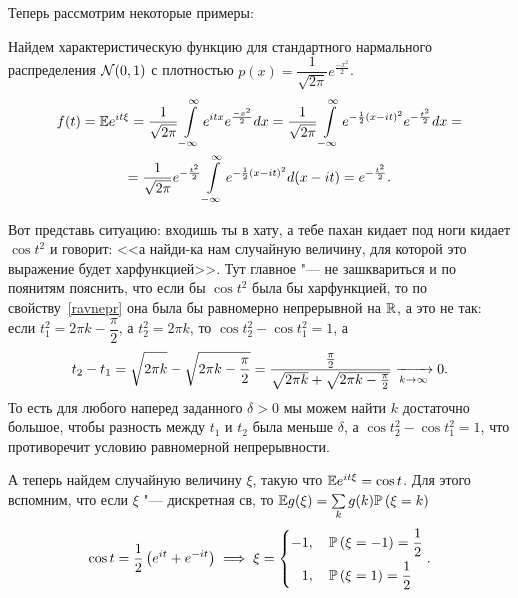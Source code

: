 \documentclass[../TV&MS.tex]{subfiles}
\begin{document}
Теперь рассмотрим некоторые примеры:

\begin{Ex}
    Найдем характеристическую функцию для стандартного нармального распределения $\mathcal{N}(0, 1)$
    с плотностью $p(x) = \dfrac{1}{\sqrt{2\pi}} e^{\frac{-x^2}{2}}$.
    \begin{multline*}
        f(t) = \mathbb{E} e^{it\xi} = 
        \frac{1}{\sqrt{2\pi}}\int\limits_{-\infty}^{\infty} e^{itx} e^{\frac{-x^2}{2}} dx =
        \frac{1}{\sqrt{2\pi}} \int\limits_{-\infty}^{\infty} 
        e^{-\frac{1}{2}(x - it)^2} e^{-\frac{t^2}{2}}dx = \\
        = \frac{1}{\sqrt{2\pi}} e^{-\frac{t^2}{2}} \int\limits_{-\infty}^{\infty}  e^{-\frac{1}{2}(x - it)^2}d(x - it) =
        e^{-\frac{t^2}{2}}
    .\end{multline*}
\end{Ex}

\begin{Ex}
    Вот представь ситуацию: входишь ты в хату, а тебе пахан кидает под ноги
    кидает $\cos t^2$ и говорит: <<а найди-ка нам случайную величину, для 
    которой это выражение будет харфункцией>>. Тут главное "--- не зашквариться
    и по поянитям пояснить, что если бы $\cos t^2$ была бы харфункцией, то по
    свойству~\eqref{ravnepr} она была бы равномерно непрерывной на $\mathbb{R}$,
    а это не так: если $t_1^2 = 2\pi k - \dfrac{\pi}{2}$, а $t_2^2 = 2\pi k$,
    то $\cos t_2^2 - \cos t_1^2 = 1$, а
    \[
        t_2 - t_1 =\sqrt{\vphantom{\frac{\pi}{2}} 2\pi k} - \sqrt{2\pi k - \frac{\pi}{2} } = 
        \frac{\frac{\pi}{2}}{\sqrt{\vphantom{\frac{\pi}{2}} 2\pi k} + \sqrt{2\pi k - \frac{\pi}{2} }}
        \xrightarrow[k \rightarrow \infty]{} 0 
    .\]
    То есть для любого наперед заданного $\delta > 0$ мы можем найти $k$
    достаточно большое, чтобы разность между $t_1$ и $t_2$ была меньше
    $\delta$, а $\cos t_2^2 - \cos t_1^2 = 1$, что противоречит условию 
    равномерной непрерывности.
\end{Ex}

\begin{Ex}
    А теперь найдем случайную величину $\xi$, такую что $\mathbb{E} e^{it\xi} = \cos t$.
    Для этого вспомним, что если $\xi$ "--- дискретная св, то 
    $\mathbb{E} g(\xi) = \sum\limits_{k} g(k) \mathbb{P} \left( \xi = k \right)  $
    \[
        \cos t = \frac{1}{2} \left( e^{it} + e^{-it} \right)
        \implies \xi = 
        \left\{
            \begin{aligned}
                -1 &, \quad \mathbb{P}\left(\xi = -1\right) = \frac{1}{2} \\
                1 &, \quad \mathbb{P} \left( \xi = 1 \right) = \frac{1}{2}
            \end{aligned}
        \right. 
    .\] 
\end{Ex} 

\newpage
\end{document}
